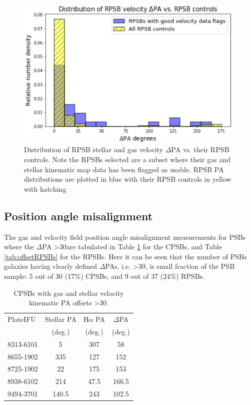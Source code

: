 \begin{figure}
    \centering
    \includegraphics[width=\columnwidth]{images/JupyterPlots/DIST-Good-RPSB+Flags+Controls.png}
    \caption[Distribution of RPSB velocity $\Delta$PA vs. their RPSB controls]{Distribution of RPSB stellar and gas velocity $\Delta$PA vs. their RPSB controls. Note the RPSBs selected are a subset where their gas and stellar kinematic map data has been flagged as usable. RPSB PA distributions are plotted in blue with their RPSB controls in yellow with hatching}
    \label{fig:RPSBvsControlDeltaPAs}
\end{figure}

\subsection{Position angle misalignment}
\label{PA-misalignment}
The gas and velocity field position angle misalignment measurements for PSBs where the $\Delta$PA \textgreater 30\textdegree are tabulated in Table \ref{tab:offsetCPSBs} for the CPSBs, and Table \ref{tab:offsetRPSBs} for the RPSBs. Here it can be seen that the number of PSBs galaxies having clearly defined $\Delta$PAs, i.e. \textgreater 30\textdegree, is small fraction of the PSB sample: 5 out of 30 (17\%) CPSBs, and 9 out of 37 (24\%) RPSBs.

\begin{table}
\centering
\caption{CPSBs with gas and stellar velocity kinematic PA offsets \textgreater 30\textdegree.}
\label{tab:offsetCPSBs}
\begin{tabular}{lccc}
\hline
PlateIFU  & Stellar PA & H$\alpha$ PA & $\Delta$PA \\
  & (deg.) & (deg.) & (deg.) \\
\hline
8313-6101 & 5 & 307 & 58 \\
8655-1902 & 335 & 127 & 152 \\
8725-1902 & 22 & 175 & 153 \\
8938-6102 & 214 & 47.5 & 166.5 \\
9494-3701 & 140.5 & 243 & 102.5 \\
\hline
\end{tabular}
\end{table}

